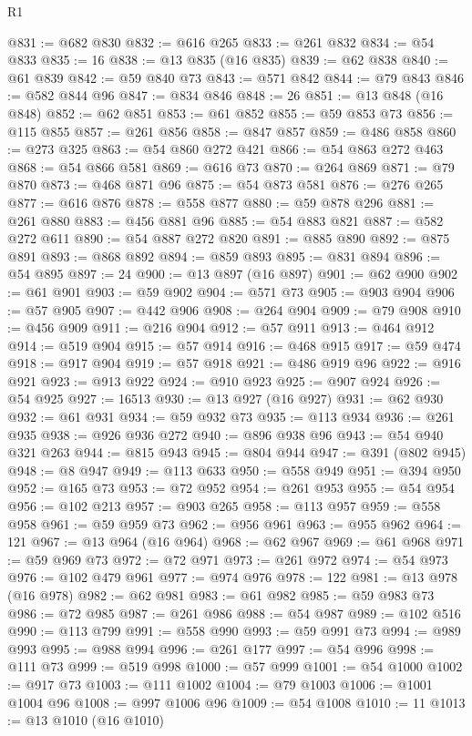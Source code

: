 \begin{lexlean}{R1}
\begin{coremodule}
@831 := @682 @830
@832 := @616 @265
@833 := @261 @832
@834 := @54 @833
@835 := 16
@838 := @13 @835 (@16 @835)
@839 := @62 @838
@840 := @61 @839
@842 := @59 @840 @73
@843 := @571 @842
@844 := @79 @843
@846 := @582 @844 @96
@847 := @834 @846
@848 := 26
@851 := @13 @848 (@16 @848)
@852 := @62 @851
@853 := @61 @852
@855 := @59 @853 @73
@856 := @115 @855
@857 := @261 @856
@858 := @847 @857
@859 := @486 @858
@860 := @273 @325
@863 := @54 @860 @272 @421
@866 := @54 @863 @272 @463
@868 := @54 @866 @581
@869 := @616 @73
@870 := @264 @869
@871 := @79 @870
@873 := @468 @871 @96
@875 := @54 @873 @581
@876 := @276 @265
@877 := @616 @876
@878 := @558 @877
@880 := @59 @878 @296
@881 := @261 @880
@883 := @456 @881 @96
@885 := @54 @883 @821
@887 := @582 @272 @611
@890 := @54 @887 @272 @820
@891 := @885 @890
@892 := @875 @891
@893 := @868 @892
@894 := @859 @893
@895 := @831 @894
@896 := @54 @895
@897 := 24
@900 := @13 @897 (@16 @897)
@901 := @62 @900
@902 := @61 @901
@903 := @59 @902
@904 := @571 @73
@905 := @903 @904
@906 := @57 @905
@907 := @442 @906
@908 := @264 @904
@909 := @79 @908
@910 := @456 @909
@911 := @216 @904
@912 := @57 @911
@913 := @464 @912
@914 := @519 @904
@915 := @57 @914
@916 := @468 @915
@917 := @59 @474
@918 := @917 @904
@919 := @57 @918
@921 := @486 @919 @96
@922 := @916 @921
@923 := @913 @922
@924 := @910 @923
@925 := @907 @924
@926 := @54 @925
@927 := 16513
@930 := @13 @927 (@16 @927)
@931 := @62 @930
@932 := @61 @931
@934 := @59 @932 @73
@935 := @113 @934
@936 := @261 @935
@938 := @926 @936 @272
@940 := @896 @938 @96
@943 := @54 @940 @321 @263
@944 := @815 @943
@945 := @804 @944
@947 := @391 (@802 @945)
@948 := @8 @947
@949 := @113 @633
@950 := @558 @949
@951 := @394 @950
@952 := @165 @73
@953 := @72 @952
@954 := @261 @953
@955 := @54 @954
@956 := @102 @213
@957 := @903 @265
@958 := @113 @957
@959 := @558 @958
@961 := @59 @959 @73
@962 := @956 @961
@963 := @955 @962
@964 := 121
@967 := @13 @964 (@16 @964)
@968 := @62 @967
@969 := @61 @968
@971 := @59 @969 @73
@972 := @72 @971
@973 := @261 @972
@974 := @54 @973
@976 := @102 @479 @961
@977 := @974 @976
@978 := 122
@981 := @13 @978 (@16 @978)
@982 := @62 @981
@983 := @61 @982
@985 := @59 @983 @73
@986 := @72 @985
@987 := @261 @986
@988 := @54 @987
@989 := @102 @516
@990 := @113 @799
@991 := @558 @990
@993 := @59 @991 @73
@994 := @989 @993
@995 := @988 @994
@996 := @261 @177
@997 := @54 @996
@998 := @111 @73
@999 := @519 @998
@1000 := @57 @999
@1001 := @54 @1000
@1002 := @917 @73
@1003 := @111 @1002
@1004 := @79 @1003
@1006 := @1001 @1004 @96
@1008 := @997 @1006 @96
@1009 := @54 @1008
@1010 := 11
@1013 := @13 @1010 (@16 @1010)

\end{coremodule}
\end{lexlean}
